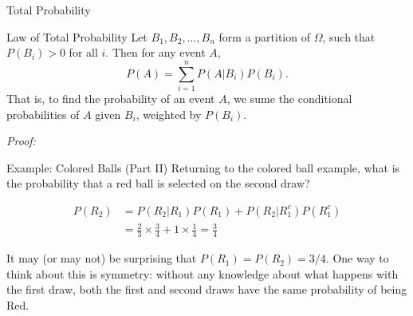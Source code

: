 \begin{frame}[allowframebreaks]{Total Probability}
  \begin{block}{Law of Total Probability}
    Let $B_1, B_2, \ldots, B_n$ form a partition of $\Omega$, such that $P(B_i) > 0$ for all $i$. Then for any event $A$,
    $$
    P(A) = \sum_{i = 1}^n P(A|B_i)P(B_i).
    $$
    That is, to find the probability of an event $A$, we sume the conditional probabilities of $A$ given $B_i$, weighted by $P(B_i)$.
  \end{block}
  
  \framebreak
  
  \emph{Proof:} 
  

  \framebreak
  
  \begin{exampleblock}{Example: Colored Balls (Part II)}
    Returning to the colored ball example, what is the probability that a red ball is selected on the second draw?
    
    \begin{align*}
    P(R_2) &= P(R_2 | R_1) P(R_1) + P(R_2 | R_1^c)P(R_1^c)\\
    &= \frac{2}{3}\times \frac{3}{4} + 1 \times \frac{1}{4} = \frac{3}{4}
    \end{align*}

  \end{exampleblock}

It may (or may not) be surprising that $P(R_1) = P(R_2) = 3/4$.
One way to think about this is symmetry: without any knowledge about what happens with the first draw, both the first and second draws have the same probability of being Red. 

\end{frame}


